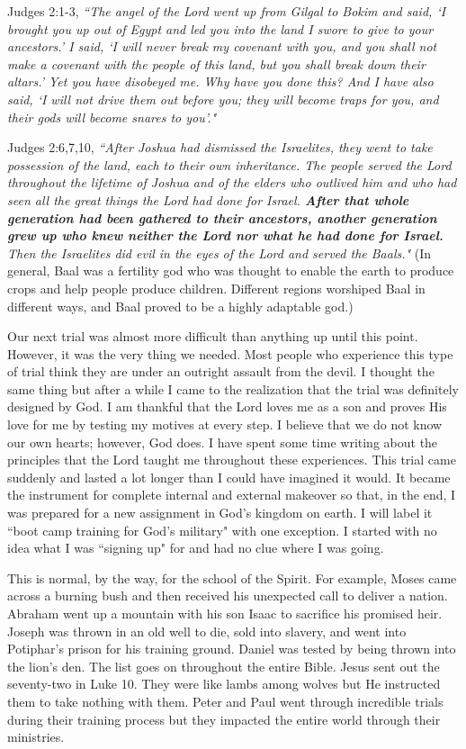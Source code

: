 \documentclass[oneside]{book}
\begin{document}
Judges 2:1-3,  \textit{``The angel of the Lord went up from Gilgal to Bokim and said, `I brought you up out of Egypt and led you into the land I swore to give to your ancestors.' I said, `I will never break my covenant with you, and you shall not make a covenant with the people of this land, but you shall break down their altars.' Yet you have disobeyed me. Why have you done this? And I have also said, `I will not drive them out before you; they will become traps for you, and their gods will become snares to you'."}

Judges 2:6,7,10, \textit{``After Joshua had dismissed the Israelites, they went to take possession of the land, each to their own inheritance. The people served the Lord throughout the lifetime of Joshua and of the elders who outlived him and who had seen all the great things the Lord had done for Israel. \textbf{After that whole generation had been gathered to their ancestors, another generation grew up who knew neither the Lord nor what he had done for Israel.} Then the Israelites did evil in the eyes of the Lord and served the Baals."} (In general, Baal was a fertility god who was thought to enable the earth to produce crops and help people produce children. Different regions worshiped Baal in different ways, and Baal proved to be a highly adaptable god.)

Our next trial was almost more difficult than anything up until this point. However, it was the very thing we needed. Most people who experience this type of trial think they are under an outright assault from the devil. I thought the same thing but after a while I came to the realization that the trial was definitely designed by God. I am thankful that the Lord loves me as a son and proves His love for me by testing my motives at every step. I believe that we do not know our own hearts; however, God does. I have spent some time writing about the principles that the Lord taught me throughout these experiences. This trial came suddenly and lasted a lot longer than I could have imagined it would. It became the instrument for complete internal and external makeover so that, in the end, I was prepared for a new assignment in God's kingdom on earth. I will label it ``boot camp training for God's military" with one exception. I started with no idea what I was ``signing up" for and had no clue where I was going. 

This is normal, by the way, for the school of the Spirit. For example, Moses came across a burning bush and then received his unexpected call to deliver a nation. Abraham went up a mountain with his son Isaac to sacrifice his promised heir. Joseph was thrown in an old well to die, sold into slavery, and went into Potiphar's prison for his training ground. Daniel was tested by being thrown into the lion's den. The list goes on throughout the entire Bible. Jesus sent out the seventy-two in Luke 10. They were like lambs among wolves but He instructed them to take nothing with them. Peter and Paul went through incredible trials during their training process but they impacted the entire world through their ministries.
\end{document}
